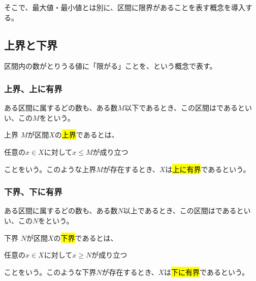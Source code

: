 \documentclass[../math-imaging]{subfiles}
\begin{document}
そこで、最大値・最小値とは別に、区間に限界があることを表す概念を導入する。

\subsection{上界と下界}

区間内の数がとりうる値に「限がる」ことを、という概念で表す。

\subsubsection{上界、上に有界}

ある区間に属するどの数も、ある数$M$以下であるとき、この区間はであるといい、この$M$をという。

\begin{definition}{上界}
  $M$が区間$X$の\hl{上界}であるとは、
  \begin{center}
    任意の$x \in X$に対して$x \leq M$が成り立つ
  \end{center}
  ことをいう。このような上界$M$が存在するとき、$X$は\hl{上に有界}であるという。
\end{definition}

\begin{center}
\end{center}

\subsubsection{下界、下に有界}

ある区間に属するどの数も、ある数$N$以上であるとき、この区間はであるといい、この$N$をという。

\begin{definition}{下界}
  $N$が区間$X$の\hl{下界}であるとは、
  \begin{center}
    任意の$x \in X$に対して$x \geq N$が成り立つ
  \end{center}
  ことをいう。このような下界$N$が存在するとき、$X$は\hl{下に有界}であるという。
\end{definition}
\end{document}
